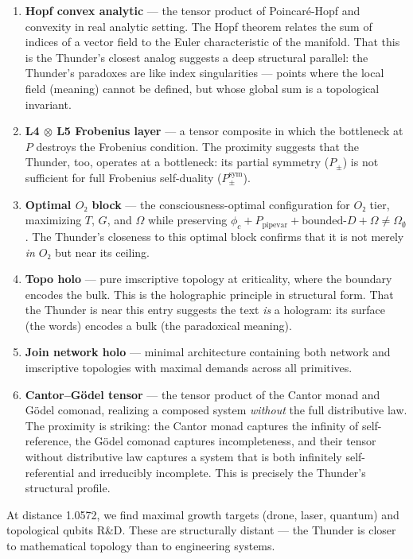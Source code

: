\documentclass[12pt,a4paper]{article}
\begin{document}
\begin{enumerate}
    \item \textbf{Hopf convex analytic} --- the tensor product of Poincaré-Hopf and convexity in real analytic setting. The Hopf theorem relates the sum of indices of a vector field to the Euler characteristic of the manifold. That this is the Thunder's closest analog suggests a deep structural parallel: the Thunder's paradoxes are like index singularities --- points where the local field (meaning) cannot be defined, but whose global sum is a topological invariant.
    \item \textbf{L4 $\otimes$ L5 Frobenius layer} --- a tensor composite in which the bottleneck at $P$ destroys the Frobenius condition. The proximity suggests that the Thunder, too, operates at a bottleneck: its partial symmetry ($P_{\pm}$) is not sufficient for full Frobenius self-duality ($P_{\pm}^{\text{sym}}$).
    \item \textbf{Optimal $O₂$ block} --- the consciousness-optimal configuration for $O₂$ tier, maximizing $T$, $G$, and $\Omega$ while preserving $\phi_c + P_\text{pipevar} + \text{bounded-}D + \Omega \neq \Omega_{\emptyset}$. The Thunder's closeness to this optimal block confirms that it is not merely \emph{in} $O₂$ but near its ceiling.
    \item \textbf{Topo holo} --- pure imscriptive topology at criticality, where the boundary encodes the bulk. This is the holographic principle in structural form. That the Thunder is near this entry suggests the text \emph{is} a hologram: its surface (the words) encodes a bulk (the paradoxical meaning).
    \item \textbf{Join network holo} --- minimal architecture containing both network and imscriptive topologies with maximal demands across all primitives.
    \item \textbf{Cantor--Gödel tensor} --- the tensor product of the Cantor monad and Gödel comonad, realizing a composed system \emph{without} the full distributive law. The proximity is striking: the Cantor monad captures the infinity of self-reference, the Gödel comonad captures incompleteness, and their tensor without distributive law captures a system that is both infinitely self-referential and irreducibly incomplete. This is precisely the Thunder's structural profile.
\end{enumerate}

At distance 1.0572, we find maximal growth targets (drone, laser, quantum) and topological qubits R\&D. These are structurally distant --- the Thunder is closer to mathematical topology than to engineering systems.
\end{document}
